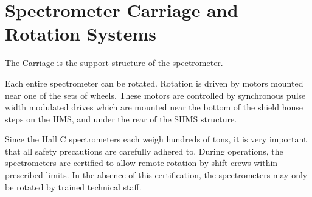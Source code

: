 \section{Spectrometer Carriage and Rotation Systems}
\label{sec:carriage}

The Carriage is the support structure of the spectrometer.

Each entire spectrometer can be rotated. Rotation is driven by motors mounted
near one of the sets of wheels. These motors are controlled by synchronous
pulse width modulated drives which are mounted near the bottom of the shield
house steps on the HMS, and under the rear of the SHMS structure.


Since the Hall C spectrometers each weigh hundreds of
tons, it is very important that all safety precautions are carefully
adhered to.   During operations, the spectrometers are certified
to allow remote rotation by shift crews within prescribed limits.  In
the absence of this certification, the spectrometers may only be
rotated by trained technical staff.


